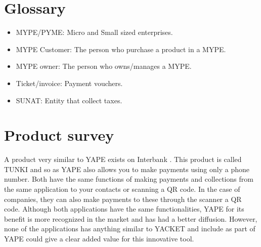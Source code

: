 \documentclass{article}
\begin{document}
\section{Glossary}

\begin{itemize}
    \item MYPE/PYME: Micro and Small sized enterprises.
    \item MYPE Customer: The person who purchase a product in a MYPE.
    \item MYPE owner: The person who owns/manages a MYPE.
    \item Ticket/invoice: Payment vouchers.
    \item SUNAT: Entity that collect taxes.
\end{itemize}


\section{Product survey}
A product very similar to YAPE exists on Interbank . This product is called TUNKI and so as YAPE also allows you to make payments using only a phone number.
Both have the same functions of making payments and collections from the
same application to your contacts or scanning a QR code. In the case of
companies, they can also make payments to these through the scanner a
QR code. Although both applications have the same functionalities,
YAPE for its benefit is more recognized in the market and has had a better
diffusion. However, none of the applications has anything similar to
YACKET and include as part of YAPE could give a clear added value
for this innovative tool.
\end{document}
